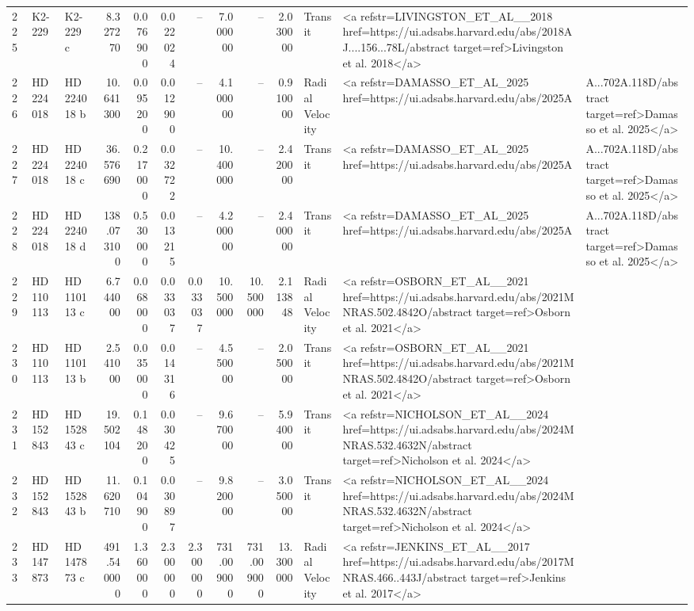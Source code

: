 \begin{tabular}{lllrrrrrrrll}
225 & K2-229 & K2-229 c & 8.327270 & 0.076900 & 0.022024 & -- & 7.000000 & -- & 2.030000 & Transit & <a refstr=LIVINGSTON_ET_AL__2018 href=https://ui.adsabs.harvard.edu/abs/2018AJ....156...78L/abstract target=ref>Livingston et al. 2018</a> \\
226 & HD 224018 & HD 224018 b & 10.641300 & 0.095200 & 0.012900 & -- & 4.100000 & -- & 0.910000 & Radial Velocity & <a refstr=DAMASSO_ET_AL_2025 href=https://ui.adsabs.harvard.edu/abs/2025A&A...702A.118D/abstract target=ref>Damasso et al. 2025</a> \\
227 & HD 224018 & HD 224018 c & 36.576690 & 0.217000 & 0.032722 & -- & 10.400000 & -- & 2.420000 & Transit & <a refstr=DAMASSO_ET_AL_2025 href=https://ui.adsabs.harvard.edu/abs/2025A&A...702A.118D/abstract target=ref>Damasso et al. 2025</a> \\
228 & HD 224018 & HD 224018 d & 138.073100 & 0.530000 & 0.013215 & -- & 4.200000 & -- & 2.400000 & Transit & <a refstr=DAMASSO_ET_AL_2025 href=https://ui.adsabs.harvard.edu/abs/2025A&A...702A.118D/abstract target=ref>Damasso et al. 2025</a> \\
229 & HD 110113 & HD 110113 c & 6.744000 & 0.068000 & 0.033037 & 0.033037 & 10.500000 & 10.500000 & 2.113848 & Radial Velocity & <a refstr=OSBORN_ET_AL__2021 href=https://ui.adsabs.harvard.edu/abs/2021MNRAS.502.4842O/abstract target=ref>Osborn et al. 2021</a> \\
230 & HD 110113 & HD 110113 b & 2.541000 & 0.035000 & 0.014316 & -- & 4.550000 & -- & 2.050000 & Transit & <a refstr=OSBORN_ET_AL__2021 href=https://ui.adsabs.harvard.edu/abs/2021MNRAS.502.4842O/abstract target=ref>Osborn et al. 2021</a> \\
231 & HD 152843 & HD 152843 c & 19.502104 & 0.148200 & 0.030425 & -- & 9.670000 & -- & 5.940000 & Transit & <a refstr=NICHOLSON_ET_AL__2024 href=https://ui.adsabs.harvard.edu/abs/2024MNRAS.532.4632N/abstract target=ref>Nicholson et al. 2024</a> \\
232 & HD 152843 & HD 152843 b & 11.620710 & 0.104900 & 0.030897 & -- & 9.820000 & -- & 3.050000 & Transit & <a refstr=NICHOLSON_ET_AL__2024 href=https://ui.adsabs.harvard.edu/abs/2024MNRAS.532.4632N/abstract target=ref>Nicholson et al. 2024</a> \\
233 & HD 147873 & HD 147873 c & 491.540000 & 1.360000 & 2.300000 & 2.300000 & 731.009000 & 731.009000 & 13.300000 & Radial Velocity & <a refstr=JENKINS_ET_AL__2017 href=https://ui.adsabs.harvard.edu/abs/2017MNRAS.466..443J/abstract target=ref>Jenkins et al. 2017</a> \\

\end{tabular}
